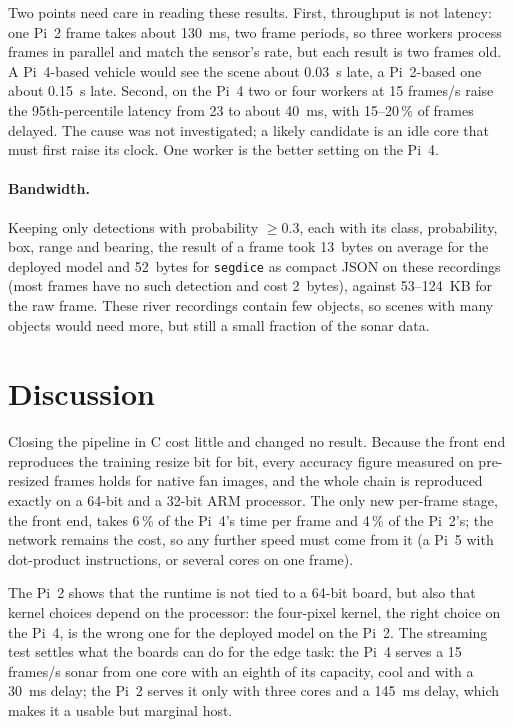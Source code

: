 \documentclass[11pt,a4paper]{article}
\newcommand{\cfg}[1]{\texttt{#1}}
\begin{document}
Two points need care in reading these results. First, throughput is not
latency: one Pi~2 frame takes about 130~ms, two frame periods, so three
workers process frames in parallel and match the sensor's rate, but each
result is two frames old. A Pi~4-based vehicle would see the scene about
0.03~s late, a Pi~2-based one about 0.15~s late. Second, on the Pi~4 two
or four workers at 15 frames/s raise the 95th-percentile latency from 23
to about 40~ms, with 15--20\,\% of frames delayed. The cause was not
investigated; a likely candidate is an idle core that must first raise its
clock. One worker is the better setting on the Pi~4.

\paragraph{Bandwidth.} Keeping only detections with probability
$\geq 0.3$, each with its class, probability, box, range and bearing,
the result of a frame took 13~bytes on average for the deployed model and
52~bytes for \cfg{segdice} as compact JSON on these recordings (most frames
have no such detection and cost 2~bytes), against 53--124~KB for the raw
frame. These river recordings contain few objects, so scenes with many
objects would need more, but still a small fraction of the sonar data.

\section{Discussion}

Closing the pipeline in C cost little and changed no result. Because the
front end reproduces the training resize bit for bit, every accuracy
figure measured on pre-resized frames holds for native fan images, and
the whole chain is reproduced exactly on a 64-bit and a 32-bit ARM
processor. The only new per-frame stage, the front end, takes 6\,\% of the
Pi~4's time per frame and 4\,\% of the Pi~2's; the network remains the
cost, so any further speed must come from it (a Pi~5 with dot-product
instructions, or several cores on one frame).

The Pi~2 shows that the runtime is not tied to a 64-bit board, but also
that kernel choices depend on the processor: the four-pixel kernel, the
right choice on the Pi~4, is the wrong one for the deployed model on the
Pi~2. The streaming test settles what the boards can do for the edge
task: the Pi~4 serves a 15 frames/s sonar from one core with an eighth of
its capacity, cool and with a 30~ms delay; the Pi~2 serves it only with
three cores and a 145~ms delay, which makes it a usable but marginal host.
\end{document}

